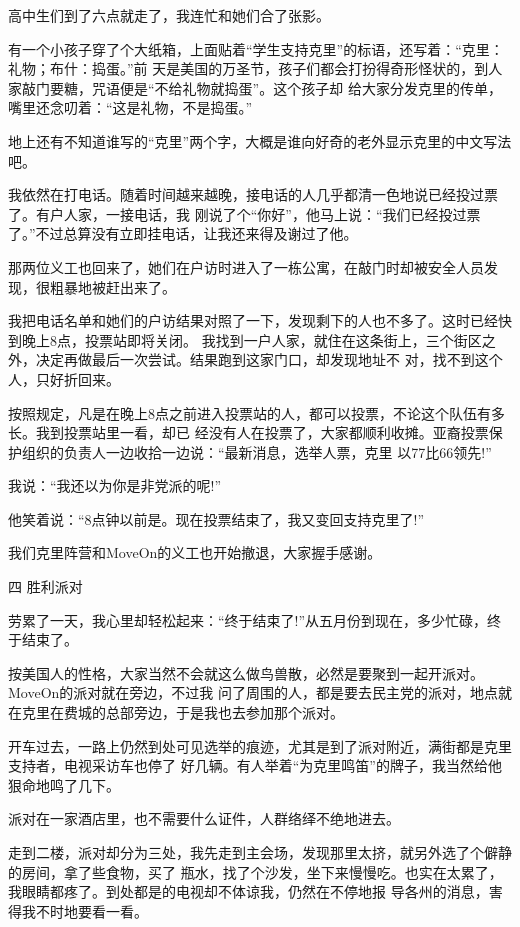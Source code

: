 ﻿\documentclass[11pt]{article}
\begin{document}
高中生们到了六点就走了，我连忙和她们合了张影。

有一个小孩子穿了个大纸箱，上面贴着``学生支持克里''的标语，还写着：``克里：礼物；布什：捣蛋。''前
天是美国的万圣节，孩子们都会打扮得奇形怪状的，到人家敲门要糖，咒语便是``不给礼物就捣蛋''。这个孩子却
给大家分发克里的传单，嘴里还念叨着：``这是礼物，不是捣蛋。''

地上还有不知道谁写的``克里''两个字，大概是谁向好奇的老外显示克里的中文写法吧。

我依然在打电话。随着时间越来越晚，接电话的人几乎都清一色地说已经投过票了。有户人家，一接电话，我
刚说了个``你好''，他马上说：``我们已经投过票了。''不过总算没有立即挂电话，让我还来得及谢过了他。

那两位义工也回来了，她们在户访时进入了一栋公寓，在敲门时却被安全人员发现，很粗暴地被赶出来了。

我把电话名单和她们的户访结果对照了一下，发现剩下的人也不多了。这时已经快到晚上8点，投票站即将关闭。
我找到一户人家，就住在这条街上，三个街区之外，决定再做最后一次尝试。结果跑到这家门口，却发现地址不
对，找不到这个人，只好折回来。

按照规定，凡是在晚上8点之前进入投票站的人，都可以投票，不论这个队伍有多长。我到投票站里一看，却已
经没有人在投票了，大家都顺利收摊。亚裔投票保护组织的负责人一边收拾一边说：``最新消息，选举人票，克里
以77比66领先!''

我说：``我还以为你是非党派的呢!''

他笑着说：``8点钟以前是。现在投票结束了，我又变回支持克里了!''

我们克里阵营和MoveOn的义工也开始撤退，大家握手感谢。

四 胜利派对

劳累了一天，我心里却轻松起来：``终于结束了!''从五月份到现在，多少忙碌，终于结束了。

按美国人的性格，大家当然不会就这么做鸟兽散，必然是要聚到一起开派对。MoveOn的派对就在旁边，不过我
问了周围的人，都是要去民主党的派对，地点就在克里在费城的总部旁边，于是我也去参加那个派对。

开车过去，一路上仍然到处可见选举的痕迹，尤其是到了派对附近，满街都是克里支持者，电视采访车也停了
好几辆。有人举着``为克里鸣笛''的牌子，我当然给他狠命地鸣了几下。

派对在一家酒店里，也不需要什么证件，人群络绎不绝地进去。

走到二楼，派对却分为三处，我先走到主会场，发现那里太挤，就另外选了个僻静的房间，拿了些食物，买了
瓶水，找了个沙发，坐下来慢慢吃。也实在太累了，我眼睛都疼了。到处都是的电视却不体谅我，仍然在不停地报
导各州的消息，害得我不时地要看一看。
\end{document}
